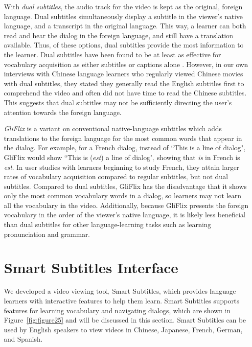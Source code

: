 \documentclass{sigchi}
\begin{document}
With \emph{dual subtitles}, the audio track for the video is kept as the original, foreign language.
Dual subtitles simultaneously display a subtitle in the viewer's native language, and a transcript in the original language. This way, a learner can both read and hear the dialog in the foreign language, and still have a translation
available. Thus, of these options, dual subtitles provide the most information to the learner.
Dual subtitles have been found to be at least as effective for vocabulary acquisition as
either subtitles or captions alone \cite{raine2012incidental}.
However, in our own interviews with Chinese language learners who regularly viewed Chinese movies
with dual subtitles, they stated they generally read the English subtitles first to comprehend the video and often did not have time to read the Chinese subtitles.
This suggests that dual subtitles may not be sufficiently
directing the user's attention
towards the foreign language.

\emph{GliFlix} \cite{gliflix} is a variant on conventional native-language subtitles which adds translations to the foreign language for the most common words that
appear in the dialog. For example, for a French dialog, instead of ``This is a line of dialog", GliFlix would show ``This is (\emph{est}) a line of dialog", showing that \emph{is} in French is \emph{est}. In user studies with learners beginning to study French, they attain larger rates of vocabulary acquisition compared to regular
subtitles, but not dual subtitles. Compared to dual subtitles, GliFlix has the disadvantage that it shows only the most common vocabulary words in a dialog, so learners may not learn all the vocabulary in the video. Additionally, because GliFlix presents the foreign vocabulary in the order of the viewer's native language, it is likely less beneficial than dual subtitles for
other language-learning tasks such as learning pronunciation and grammar.

\section{Smart Subtitles Interface}

We developed a video viewing tool, Smart Subtitles, which provides
language learners with interactive features to help them learn.
Smart Subtitles supports features for learning vocabulary and navigating dialogs, which are shown in Figure~\ref{fig:figure25} and will be discussed in this section. Smart Subtitles can be used by English speakers to view videos in Chinese, Japanese, French, German, and Spanish. %
\end{document}
